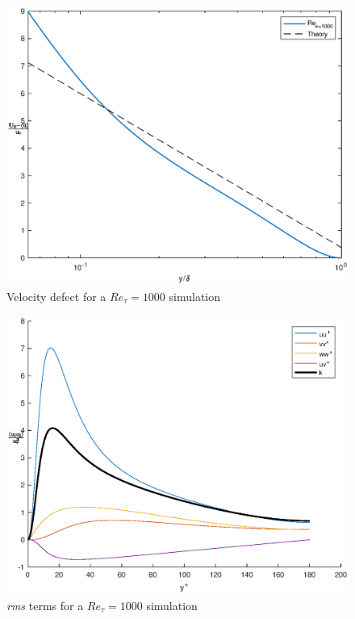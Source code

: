 \begin{figure}
\begin{center}
\includegraphics[scale=0.55]{grafici/velocity_defect_1000.eps}
\caption{Velocity defect for a $Re_{\tau}=1000$ simulation}
\label{velocity:defect:1000}
\end{center} 
\end{figure}

\begin{figure}
\begin{center}
\includegraphics[scale=0.55]{grafici/budget+k_1000.eps}
\caption{\emph{rms} terms for a $Re_{\tau}=1000$ simulation}
\label{budget:1000}
\end{center} 
\end{figure}


